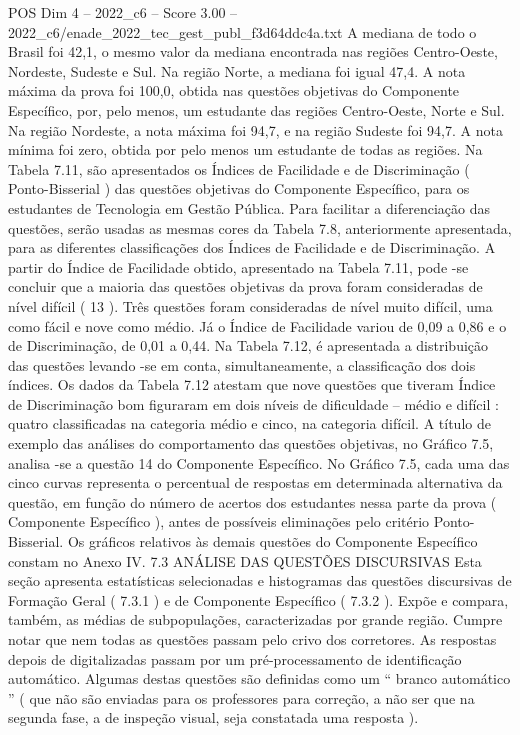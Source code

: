 \begin{textsample}{POS Dim 4 – 2022\_c6 – Score 3.00 – 2022\_c6/enade\_2022\_tec\_gest\_publ\_f3d64ddc4a.txt}
A mediana de todo o Brasil foi 42,1, o mesmo valor da mediana encontrada nas regiões Centro-Oeste, Nordeste, Sudeste e Sul.
Na região Norte, a mediana foi igual 47,4.
A nota máxima da prova foi 100,0, obtida nas questões objetivas do Componente Específico, por, pelo menos, um estudante das regiões Centro-Oeste, Norte e Sul.
Na região Nordeste, a nota máxima foi 94,7, e na região Sudeste foi 94,7.
A nota mínima foi zero, obtida por pelo menos um estudante de todas as regiões.
Na Tabela 7.11, são apresentados os Índices de Facilidade e de Discriminação ( Ponto-Bisserial ) das questões objetivas do Componente Específico, para os estudantes de Tecnologia em Gestão Pública.
Para facilitar a diferenciação das questões, serão usadas as mesmas cores da Tabela 7.8, anteriormente apresentada, para as diferentes classificações dos Índices de Facilidade e de Discriminação.
A partir do Índice de Facilidade obtido, apresentado na Tabela 7.11, pode -se concluir que a maioria das questões objetivas da prova foram consideradas de nível difícil ( 13 ).
Três questões foram consideradas de nível muito difícil, uma como fácil e nove como médio.
Já o Índice de Facilidade variou de 0,09 a 0,86 e o de Discriminação, de 0,01 a 0,44.
Na Tabela 7.12, é apresentada a distribuição das questões levando -se em conta, simultaneamente, a classificação dos dois índices.
Os dados da Tabela 7.12 atestam que nove questões que tiveram Índice de Discriminação bom figuraram em dois níveis de dificuldade – médio e difícil : quatro classificadas na categoria médio e cinco, na categoria difícil.
A título de exemplo das análises do comportamento das questões objetivas, no Gráfico 7.5, analisa -se a questão 14 do Componente Específico.
No Gráfico 7.5, cada uma das cinco curvas representa o percentual de respostas em determinada alternativa da questão, em função do número de acertos dos estudantes nessa parte da prova ( Componente Específico ), antes de possíveis eliminações pelo critério Ponto-Bisserial.
Os gráficos relativos às demais questões do Componente Específico constam no Anexo IV. 7.3 ANÁLISE DAS QUESTÕES DISCURSIVAS Esta seção apresenta estatísticas selecionadas e histogramas das questões discursivas de Formação Geral ( 7.3.1 ) e de Componente Específico ( 7.3.2 ).
Expõe e compara, também, as médias de subpopulações, caracterizadas por grande região.
Cumpre notar que nem todas as questões passam pelo crivo dos corretores.
As respostas depois de digitalizadas passam por um pré-processamento de identificação automático.
Algumas destas questões são definidas como um “ branco automático ” ( que não são enviadas para os professores para correção, a não ser que na segunda fase, a de inspeção visual, seja constatada uma resposta ).

\end{textsample}
